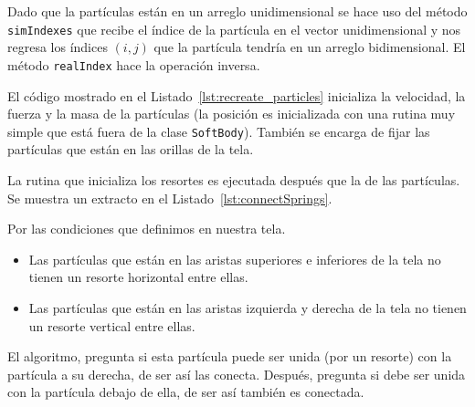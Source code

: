 Dado que la partículas están en un arreglo unidimensional se hace uso del método \texttt{simIndexes} que recibe el índice de la partícula en el vector unidimensional y nos regresa los índices $(i, j)$ que la partícula tendría en un arreglo bidimensional. El método \texttt{realIndex} hace la operación inversa.


El código mostrado en el Listado~\ref{lst:recreate_particles} inicializa la velocidad, la fuerza y la masa de la partículas (la posición es inicializada con una rutina muy simple que está fuera de la clase \texttt{SoftBody}). 
También se encarga de fijar las partículas que están en las orillas de la tela.

La rutina que inicializa los resortes es ejecutada después que la de las partículas. Se muestra un extracto en el Listado~\ref{lst:connectSprings}.


Por las condiciones que definimos en nuestra tela.
\begin{itemize}
 \item Las partículas que están en las aristas superiores e inferiores de la tela no tienen un resorte horizontal entre ellas.
 \item Las partículas que están en las aristas izquierda y derecha de la tela no tienen un resorte vertical entre ellas.
\end{itemize}

El algoritmo, pregunta si esta partícula puede ser unida (por un resorte) con la partícula a su derecha, de ser así las conecta. Después, pregunta si debe ser unida con la partícula debajo de ella, de ser así también es conectada.


